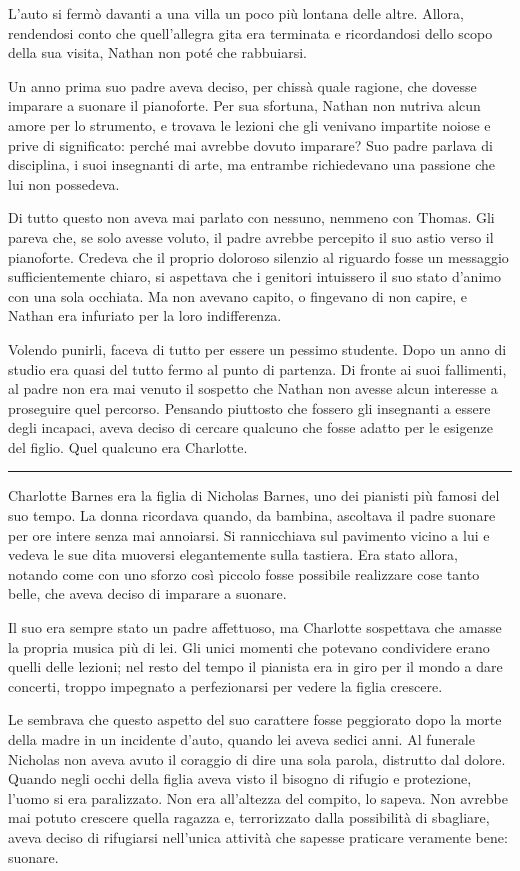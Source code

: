 L'auto si fermò davanti a una villa un poco più lontana delle altre. Allora, rendendosi conto che
quell'allegra gita era terminata e ricordandosi dello scopo della sua visita, Nathan non poté che
rabbuiarsi.

Un anno prima suo padre aveva deciso, per chissà quale ragione, che dovesse imparare a suonare il
pianoforte. Per sua sfortuna, Nathan non nutriva alcun amore per lo strumento, e trovava le lezioni
che gli venivano impartite noiose e prive di significato: perché mai avrebbe dovuto imparare? Suo
padre parlava di disciplina, i suoi insegnanti di arte, ma entrambe richiedevano una passione che
lui non possedeva.

Di tutto questo non aveva mai parlato con nessuno, nemmeno con Thomas. Gli pareva che, se solo
avesse voluto, il padre avrebbe percepito il suo astio verso il pianoforte. Credeva che il proprio
doloroso silenzio al riguardo fosse un messaggio sufficientemente chiaro, si aspettava che i
genitori intuissero il suo stato d'animo con una sola occhiata. Ma non avevano capito, o fingevano
di non capire, e Nathan era infuriato per la loro indifferenza.

Volendo punirli, faceva di tutto per essere un pessimo studente. Dopo un anno di studio era quasi
del tutto fermo al punto di partenza. Di fronte ai suoi fallimenti, al padre non era mai venuto il
sospetto che Nathan non avesse alcun interesse a proseguire quel percorso. Pensando piuttosto che
fossero gli insegnanti a essere degli incapaci, aveva deciso di cercare qualcuno che fosse adatto
per le esigenze del figlio. Quel qualcuno era Charlotte.

\plainbreak{1}

Charlotte Barnes era la figlia di Nicholas Barnes, uno dei pianisti più famosi del suo tempo. La
donna ricordava quando, da bambina, ascoltava il padre suonare per ore intere senza mai annoiarsi.
Si rannicchiava sul pavimento vicino a lui e vedeva le sue dita muoversi elegantemente sulla
tastiera. Era stato allora, notando come con uno sforzo così piccolo fosse possibile realizzare cose
tanto belle, che aveva deciso di imparare a suonare.

Il suo era sempre stato un padre affettuoso, ma Charlotte sospettava che amasse la propria musica
più di lei. Gli unici momenti che potevano condividere erano quelli delle lezioni; nel resto del
tempo il pianista era in giro per il mondo a dare concerti, troppo impegnato a perfezionarsi per
vedere la figlia crescere.

Le sembrava che questo aspetto del suo carattere fosse peggiorato dopo la morte della madre in un
incidente d'auto, quando lei aveva sedici anni. Al funerale Nicholas non aveva avuto il coraggio di
dire una sola parola, distrutto dal dolore. Quando negli occhi della figlia aveva visto il bisogno
di rifugio e protezione, l'uomo si era paralizzato. Non era all'altezza del compito, lo sapeva. Non
avrebbe mai potuto crescere quella ragazza e, terrorizzato dalla possibilità di sbagliare, aveva
deciso di rifugiarsi nell'unica attività che sapesse praticare veramente bene: suonare.

